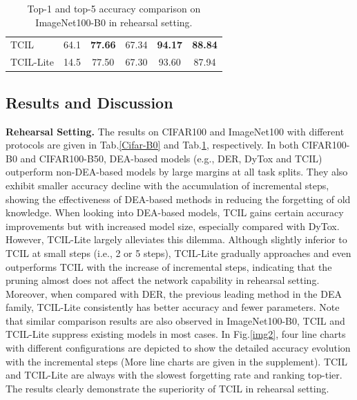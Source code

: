\documentclass[letterpaper]{article} %
\begin{document}
\begin{table}
{\begin{tabular}{@{}l|ccccc@{}}
TCIL                                                    & 64.1             & \textbf{77.66} & \multicolumn{1}{c|}{67.34} & \textbf{94.17} & \textbf{88.84} \\
TCIL-Lite                                               & 14.5     & 77.50 & \multicolumn{1}{c|}{67.30} & 93.60  & 87.94                       \\ \bottomrule
\end{tabular}
}
\caption{Top-1 and top-5 accuracy comparison on ImageNet100-B0 in rehearsal setting.}
\label{IM100-B0}
\end{table}


\subsection{Results and Discussion}
\textbf{Rehearsal Setting.}
The results on CIFAR100 and ImageNet100 with different protocols are given in Tab.\ref{Cifar-B0} and Tab.\ref{IM100-B0}, respectively. In both CIFAR100-B0 and CIFAR100-B50, DEA-based models (e.g., DER, DyTox and TCIL) outperform non-DEA-based models by large margins at all task splits. They also exhibit smaller accuracy decline with the accumulation of incremental steps, showing the effectiveness of DEA-based methods in reducing the forgetting of old knowledge. When looking into DEA-based models, TCIL gains certain accuracy improvements but with increased model size, especially compared with DyTox. However, TCIL-Lite largely alleviates this dilemma. Although slightly inferior to TCIL at small steps (i.e., 2 or 5 steps), TCIL-Lite gradually approaches and even outperforms TCIL with the increase of incremental steps, indicating that the pruning almost does not affect the network capability in rehearsal setting. Moreover, when compared with DER, the previous leading method in the DEA family, TCIL-Lite consistently has better accuracy and fewer parameters. Note that similar comparison results are also observed in ImageNet100-B0, TCIL and TCIL-Lite suppress existing models in most cases. In Fig.\ref{img2}, four line charts with different configurations are depicted to show the detailed accuracy evolution with the incremental steps (More line charts are given in the supplement). TCIL and TCIL-Lite are always with the slowest forgetting rate and ranking top-tier. The results clearly demonstrate the superiority of TCIL in rehearsal setting.
\end{document}
